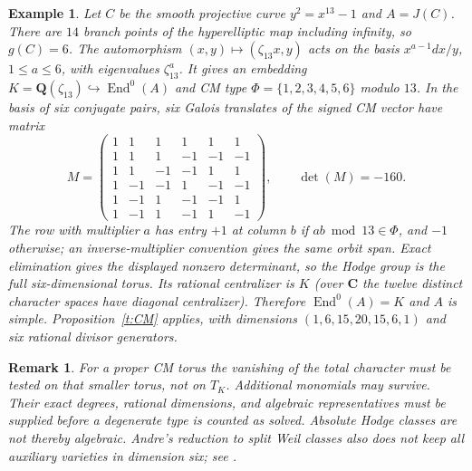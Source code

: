 \documentclass[10pt,reqno]{article}
\theoremstyle{emphasizedplain}
\theoremstyle{emphasizeddefinition}
\newtheorem{example}[theorem]{Example}
\theoremstyle{emphasizeddefinition}
\newtheorem{remark}[theorem]{Remark}
\DeclareMathOperator{\End}{End}
\newcommand{\Q}{\mathbf Q}
\newcommand{\C}{\mathbf C}
\begin{document}
\begin{example}\label{ex:CM13}
Let $C$ be the smooth projective curve $y^2=x^{13}-1$ and $A=J(C)$.
There are $14$ branch points of the hyperelliptic map including infinity,
so $g(C)=6$. The automorphism $(x,y)\mapsto(\zeta_{13}x,y)$ acts on the
basis $x^{a-1}dx/y$, $1\leq a\leq6$, with eigenvalues $\zeta_{13}^a$.
It gives an embedding $K=\Q(\zeta_{13})\hookrightarrow\End^0(A)$ and
CM type $\Phi=\{1,2,3,4,5,6\}$ modulo $13$.
In the basis of six conjugate pairs, six Galois translates of the signed
CM vector have matrix
\[
 M=\begin{pmatrix}
1&1&1&1&1&1\\
1&1&1&-1&-1&-1\\
1&1&-1&-1&1&1\\
1&-1&-1&1&-1&-1\\
1&-1&1&-1&-1&1\\
1&-1&1&-1&1&-1
\end{pmatrix},\qquad\det(M)=-160.
\]
The row with multiplier $a$ has entry $+1$ at column $b$ if
$ab\bmod13\in\Phi$, and $-1$ otherwise; an inverse-multiplier convention
gives the same orbit span. Exact elimination gives the displayed nonzero
determinant, so the Hodge group is the full six-dimensional torus.
Its rational centralizer is $K$ (over $\C$ the twelve distinct character
spaces have diagonal centralizer). Therefore $\End^0(A)=K$ and $A$ is
simple. Proposition~\ref{t:CM} applies, with dimensions
$(1,6,15,20,15,6,1)$ and six rational divisor generators.
\end{example}
\begin{remark}
For a proper CM torus the vanishing of the total character must be tested
on that smaller torus, not on $T_K$. Additional monomials may survive.
Their exact degrees, rational dimensions, and algebraic representatives
must be supplied before a degenerate type is counted as solved.
Absolute Hodge classes are not thereby algebraic. Andre's reduction to
split Weil classes also does not keep all auxiliary varieties in dimension
six; see \cite[Theorem 1.4]{MarkmanSurvey}.
\end{remark}
\end{document}

